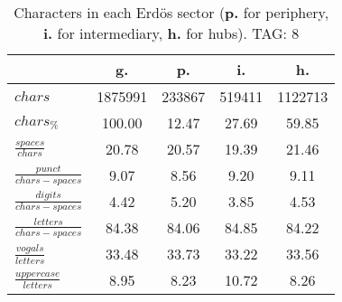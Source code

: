 \begin{table}[h!]
\begin{center}
\begin{tabular}{| l || c | c | c | c |}\hline
 & {\bf g.} & {\bf p.} & {\bf i.} & {\bf h.} \\\hline\hline
$chars$ & 1875991  & 233867  & 519411  & 1122713 \\
$chars_{\%}$ & 100.00  & 12.47  & 27.69  & 59.85 \\\hline
$\frac{spaces}{chars}$ & 20.78  & 20.57  & 19.39  & 21.46 \\
$\frac{punct}{chars-spaces}$ & 9.07  & 8.56  & 9.20  & 9.11 \\
$\frac{digits}{chars-spaces}$ & 4.42  & 5.20  & 3.85  & 4.53 \\\hline
$\frac{letters}{chars-spaces}$ & 84.38  & 84.06  & 84.85  & 84.22 \\
$\frac{vogals}{letters}$ & 33.48  & 33.73  & 33.22  & 33.56 \\
$\frac{uppercase}{letters}$ & 8.95  & 8.23  & 10.72  & 8.26 \\\hline
\end{tabular}
\caption{Characters in each Erd\"os sector ({{\bf p.}} for periphery, {{\bf i.}} for intermediary, 
    {{\bf h.}} for hubs). TAG: 8}
\end{center}
\end{table}